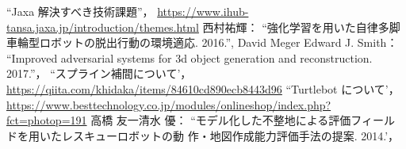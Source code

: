 \documentclass[uplatex,twocolumn, dvipdfmx]{jsarticle}  %
\begin{document}

\small
\begin{thebibliography}{9}

``Jaxa 解決すべき技術課題''，
  \url{https://www.ihub-tansa.jaxa.jp/introduction/themes.html}
西村祐輝：
  ``強化学習を用いた自律多脚車輪型ロボットの脱出行動の環境適応. 2016.'',
David Meger Edward J. Smith：
  ``Improved adversarial systems for 3d object generation and
  reconstruction. 2017.''，
  ``スプライン補間について'，
  \url{https://qiita.com/khidaka/items/84610cd890ecb8443d96}
  ``Turtlebot について'，
  \url{https://www.besttechnology.co.jp/modules/onlineshop/index.php?fct=photop=191}
  高橋 友一清水 優：
  ``モデル化した不整地による評価フィールドを用いたレスキューロボットの動
  作・地図作成能力評価手法の提案. 2014.'，
\end{thebibliography}
\end{document}
